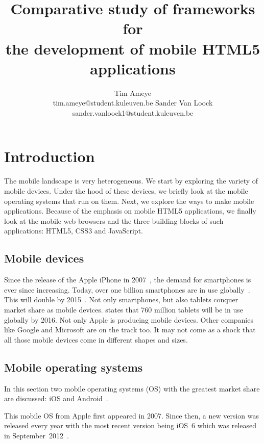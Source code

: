 \documentclass[a4paper]{artikel3}
\title{Comparative study of frameworks for \\ the development of mobile HTML5 applications}
\author{Tim Ameye \\ tim.ameye@student.kuleuven.be \And Sander Van Loock \\ sander.vanloock1@student.kuleuven.be}
\renewcommand{\paragraph}[1]{\vspace{2mm} \noindent {\bf #1}  }
\begin{document}
\maketitle


\section{Introduction} %
\label{sec:introduction}
The mobile landscape is very heterogeneous.
We start by exploring the variety of mobile devices.
Under the hood of these devices, we briefly look at the mobile operating systems that run on them. 
Next, we explore the ways to make mobile applications.
Because of the emphasis on mobile HTML5 applications, we finally look at the mobile web browsers and the three building blocks of such applications: HTML5, CSS3 and JavaScript.

\subsection{Mobile devices}
Since the release of the Apple iPhone in 2007~\cite{David2011}, the demand for smartphones is ever since increasing. 
Today, over one billion smartphones are in use globally~\cite{Yang2012}.
This will double by 2015~\cite{Gillett2012}.
Not only smartphones, but also tablets conquer market share as mobile devices.
\cite{Gillett2012} states that 760 million tablets will be in use globally by 2016.
Not only Apple is producing mobile devices.
Other companies like Google and Microsoft are on the track too.
It may not come as a shock that all those mobile devices come in different shapes and sizes.
\subsection{Mobile operating systems}
In this section two mobile operating systems (OS) with the greatest market share are discussed: iOS and Android~\cite{David2011, Hales2012}.

\paragraph{iOS}
This mobile OS from Apple first appeared in 2007.
Since then, a new version was released every year with the most recent version being iOS~6 which was released in September~2012~\cite{Deitel2012, PhilDutson2012}.
 
\end{document}
